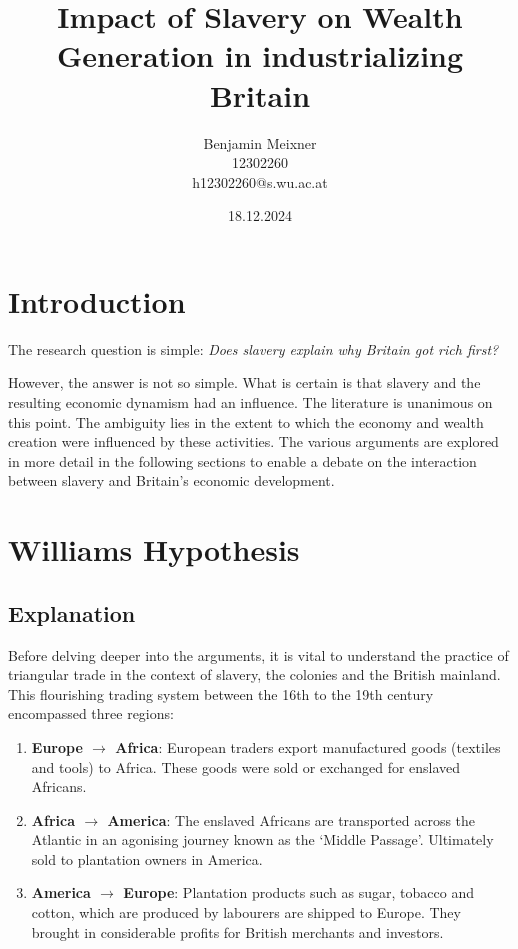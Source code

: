 \documentclass[a4paper,11pt]{article}
\begin{document}
\title{Impact of Slavery on Wealth Generation in industrializing Britain}
\author{Benjamin Meixner \\ 12302260 \\ h12302260@s.wu.ac.at}
\date{18.12.2024} %
\maketitle

\pagebreak

\tableofcontents

\pagebreak

\section*{Introduction}

The research question is simple: \qquad \textit{Does slavery explain why Britain got rich first?}

However, the answer is not so simple. What is certain is that slavery and the resulting economic dynamism had an influence. The literature is unanimous on this point. The ambiguity lies in the extent to which the economy and wealth creation were influenced by these activities. The various arguments are explored in more detail in the following sections to enable a debate on the interaction between slavery and Britain's economic development.

\section{Williams Hypothesis}
\subsection{Explanation}

Before delving deeper into the arguments, it is vital to understand the practice of triangular trade in the context of slavery, the colonies and the British mainland. This flourishing trading system between the 16th to the 19th century encompassed three regions:

\begin{enumerate}
    \itemsep0em
    \item \textbf{Europe $\rightarrow$ Africa}: European traders export manufactured goods (textiles and tools) to Africa. These goods were sold or exchanged for enslaved Africans.

    \item \textbf{Africa $\rightarrow$ America}: The enslaved Africans are transported across the Atlantic in an agonising journey known as the ‘Middle Passage’. Ultimately sold to plantation owners in America.

    \item \textbf{America $\rightarrow$ Europe}: Plantation products such as sugar, tobacco and cotton, which are produced by labourers are shipped to Europe. They brought in considerable profits for British merchants and investors.
\end{enumerate}
\end{document}
